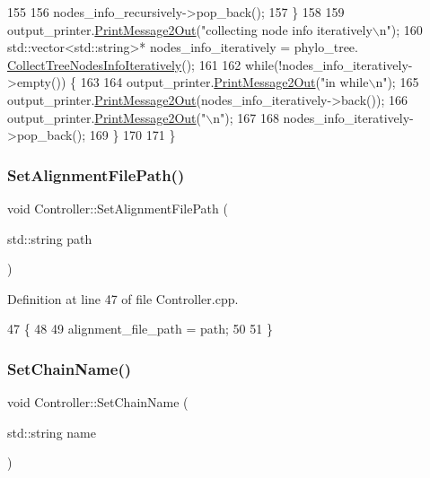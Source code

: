 \begin{DoxyCode}
155     
156     nodes\_info\_recursively->pop\_back();
157   \}
158   
159   output\_printer.\hyperlink{classOutputPrinter_ae9cd642df56fb6febef4cccff7ca12f2}{PrintMessage2Out}(\textcolor{stringliteral}{"collecting node info iteratively\(\backslash\)n"});
160   std::vector<std::string>* nodes\_info\_iteratively = phylo\_tree.
      \hyperlink{classTree_a9a6309402407a051b346e779169f2ffc}{CollectTreeNodesInfoIteratively}();
161   
162   \textcolor{keywordflow}{while}(!nodes\_info\_iteratively->empty()) \{
163     
164     output\_printer.\hyperlink{classOutputPrinter_ae9cd642df56fb6febef4cccff7ca12f2}{PrintMessage2Out}(\textcolor{stringliteral}{"in while\(\backslash\)n"});
165     output\_printer.\hyperlink{classOutputPrinter_ae9cd642df56fb6febef4cccff7ca12f2}{PrintMessage2Out}(nodes\_info\_iteratively->back());
166     output\_printer.\hyperlink{classOutputPrinter_ae9cd642df56fb6febef4cccff7ca12f2}{PrintMessage2Out}(\textcolor{stringliteral}{"\(\backslash\)n"});
167     
168     nodes\_info\_iteratively->pop\_back();
169   \}
170   
171 \}
\end{DoxyCode}
\mbox{\label{classController_a67b2357dbc00faba0f6557f3660e8711}} 
\subsubsection{\texorpdfstring{Set\+Alignment\+File\+Path()}{SetAlignmentFilePath()}}
{\footnotesize\ttfamily void Controller\+::\+Set\+Alignment\+File\+Path (\begin{DoxyParamCaption}\item[{std\+::string}]{path }\end{DoxyParamCaption})}



Definition at line 47 of file Controller.\+cpp.


\begin{DoxyCode}
47                                                     \{
48   
49   alignment\_file\_path = path;
50   
51 \}
\end{DoxyCode}
\mbox{\label{classController_aa122ac902c36eeb2889e12558d4ad087}} 
\subsubsection{\texorpdfstring{Set\+Chain\+Name()}{SetChainName()}}
{\footnotesize\ttfamily void Controller\+::\+Set\+Chain\+Name (\begin{DoxyParamCaption}\item[{std\+::string}]{name }\end{DoxyParamCaption})}



